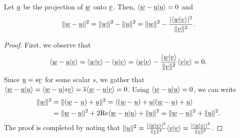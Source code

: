 \begin{lemma} \label{lem:proj_loss}
Let $\underline{u}$ be the projection of $\underline{w}$ onto $\underline{v}$.
Then, $\langle \underline{w}-\underline{u} | \underline{u} \rangle = 0$ and
\[ \|\underline{w}-\underline{u}\|^2 =  \|\underline{w}\|^2 - \| \underline{u} \|^2 = \|\underline{w}\|^2 - \frac{|\langle \underline{w} | \underline{v} \rangle|^2}{\|\underline{v}\|^2}. \]
\end{lemma}
\begin{proof}
First, we observe that
\[ \langle \underline{w} - \underline{u} | \underline{v} \rangle = \langle \underline{w} | \underline{v} \rangle - \langle \underline{u} | \underline{v} \rangle = \langle \underline{w} | \underline{v} \rangle - \frac{\left\langle \underline{w} | \underline{v} \right\rangle}{\|\underline{v}\|^2} \langle \underline{v} | \underline{v} \rangle = 0. \]
Since $\underline{u} = s \underline{v}$ for some scalar $s$, we gather that $\langle \underline{w}-\underline{u} | \underline{u} \rangle = \langle \underline{w}-\underline{u} | s \underline{v} \rangle = \overline{s} \langle \underline{w}-\underline{u} | \underline{v} \rangle = 0$.
Using $\langle \underline{w}-\underline{u} | \underline{u} \rangle = 0$, we can write
\begin{align*}
\|\underline{w}\|^2 &= \|(\underline{w}-\underline{u})+\underline{u}\|^2
= \langle (\underline{w}-\underline{u})+\underline{u}|(\underline{w}-\underline{u})+\underline{u}\rangle \\
&= \|\underline{w}-\underline{u}\|^2 + 2 \mathrm{Re} \langle \underline{w}-\underline{u} | \underline{u} \rangle + \|\underline{u}\|^2
= \|\underline{w}-\underline{u}\|^2 + \|\underline{u}\|^2.
\end{align*}
The proof is completed by noting that
$\|\underline{u}\|^2
= \frac{|\langle \underline{w} | \underline{v} \rangle|^2}{\|\underline{v}\|^4}
\langle \underline{v} | \underline{v} \rangle
= \frac{|\langle \underline{w} | \underline{v} \rangle|^2}{\|\underline{v}\|^2}$.
\end{proof}

